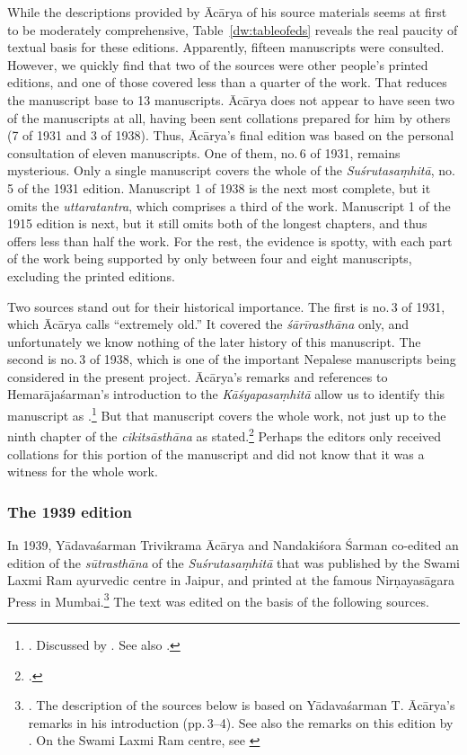 While the descriptions provided by Ācārya of his source materials seems at first
to be moderately comprehensive, Table~\ref{dw:tableofeds} reveals the real paucity
of textual basis for these editions.  Apparently, fifteen manuscripts were
consulted.  However, we quickly find that two of the sources were other people's
printed editions, and one of those covered less than a quarter of the work.  That
reduces the manuscript base to 13 manuscripts.   Ācārya does not appear to have
seen two of the manuscripts at all, having been sent collations prepared for him
by others (7 of 1931 and 3 of 1938).  Thus, Ācārya's final edition was based on
the personal consultation of eleven manuscripts.   One of them, no.\,6 of 1931,
remains mysterious. Only a single manuscript covers the whole of the
\emph{Suśrutasaṃhitā}, no.\,5 of the 1931 edition.  Manuscript 1 of 1938 is the
next most complete, but it omits the \emph{uttaratantra}, which comprises a third
of the work.  Manuscript 1 of the 1915 edition is next, but it still omits both of
the longest chapters, and thus offers less than half the work.  For the rest, the
evidence is spotty, with each part of the work being supported by only between
four and eight manuscripts, excluding the printed editions.

Two sources stand out for their historical importance.  The first is no.\,3 of
1931, which Ācārya calls “extremely old.”  It covered the \emph{śārīrasthāna}
only, and unfortunately we know nothing of the later history of this manuscript.
The second is no.\,3 of 1938, which is one of the important Nepalese manuscripts
being considered in the present project. Ācārya's remarks and references to
Hemarājaśarman's introduction to the \emph{Kāśyapasaṃhitā} allow us
to identify this manuscript as .\footnote{\cites[22]{vulgate}[56--57]{hema-1938}. Discussed by
\citet[\S 1.1, 2.3]{kleb-2021b}.  See also \cites[IIB, 
25--41]{meul-hist}[161--169]{wuja-2003}.} But 
that manuscript covers the whole work, not
just up to the ninth chapter of the \emph{cikitsāsthāna} as
\citeauthor{vulgate} stated.\footcite[22]{vulgate}  Perhaps the editors
only received collations for this portion of the manuscript and did not know that it
was a witness for the whole work.

\subsubsection{The 1939 edition}        

In 1939, Yādavaśarman Trivikrama Ācārya and Nandakiśora Śarman co-edited an
edition of the \emph{sūtrasthāna} of the \emph{Suśrutasaṃhitā} that was published
by the Swami Laxmi Ram ayurvedic centre in Jaipur, and printed at the famous
Nirṇayasāgara Press in Mumbai.\footnote{\cite{acar-1939}.  The description of the sources 
below is based on Yādavaśarman T. Ācārya's  remarks in his introduction 
(pp.\,3--4). See also the remarks on this edition by
\citet[7]{kleb-2021a}.  On the Swami Laxmi Ram
centre, see \cite{hofe-2007}} The text was edited on the basis of the following sources.



